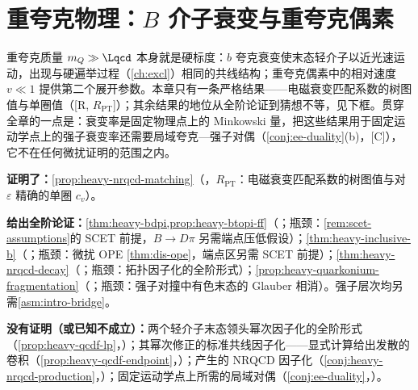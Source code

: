 \chapter{重夸克物理：$B$ 介子衰变与重夸克偶素}\label{ch:heavy}

重夸克质量 $m_Q\gg\Lqcd$ 本身就是硬标度：$b$ 夸克衰变使末态轻介子以近光速运动，出现与硬遍举过程（\cref{ch:excl}）相同的共线结构；重夸克偶素中的相对速度 $v\ll1$ 提供第二个展开参数。本章只有一条严格结果——电磁衰变匹配系数的树图值与单圈值（[R, $R_{\mathrm{PT}}$]）；其余结果的地位从全阶论证到猜想不等，见下框。贯穿全章的一点是：衰变率是固定物理点上的 Minkowski 量，把这些结果用于固定运动学点上的强子衰变率还需要局域夸克—强子对偶（\cref{conj:ee-duality}(b)，[C]），它不在任何微扰证明的范围之内。

\begin{tcolorbox}[enhanced,breakable,title=本章证明了什么／没有证明什么,fonttitle=\bfseries,
  colback=gray!3!white,colframe=gray!55!black,boxrule=0.6pt,arc=2pt,
  left=5pt,right=5pt,top=3pt,bottom=3pt,before skip=6pt,after skip=6pt]
\textbf{证明了：}\cref{prop:heavy-nrqcd-matching}（\tagR，$R_{\mathrm{PT}}$：电磁衰变匹配系数的树图值与对 $\varepsilon$ 精确的单圈 $c_v$）。\par
\textbf{给出全阶论证：}\cref{thm:heavy-bdpi,prop:heavy-btopi-ff}（\tagA；瓶颈：\cref{rem:scet-assumptions}的 SCET 前提，$B\to D\pi$ 另需端点压低假设）；\cref{thm:heavy-inclusive-b}（\tagA；瓶颈：微扰 OPE \cref{thm:dis-ope}，端点区另需 SCET 前提）；\cref{thm:heavy-nrqcd-decay}（\tagA；瓶颈：拓扑因子化的全阶形式）；\cref{prop:heavy-quarkonium-fragmentation}（\tagA；瓶颈：强子对撞中有色末态的 Glauber 相消）。强子层次均另需\cref{asm:intro-bridge}。\par
\textbf{没有证明（或已知不成立）：}两个轻介子末态领头幂次因子化的全阶形式（\cref{prop:heavy-qcdf-lp}，\tagP）；其幂次修正的标准共线因子化——显式计算给出发散的卷积（\cref{prop:heavy-qcdf-endpoint}，\tagV）；产生的 NRQCD 因子化（\cref{conj:heavy-nrqcd-production}，\tagC）；固定运动学点上所需的局域对偶（\cref{conj:ee-duality}，\tagC）。
\end{tcolorbox}

